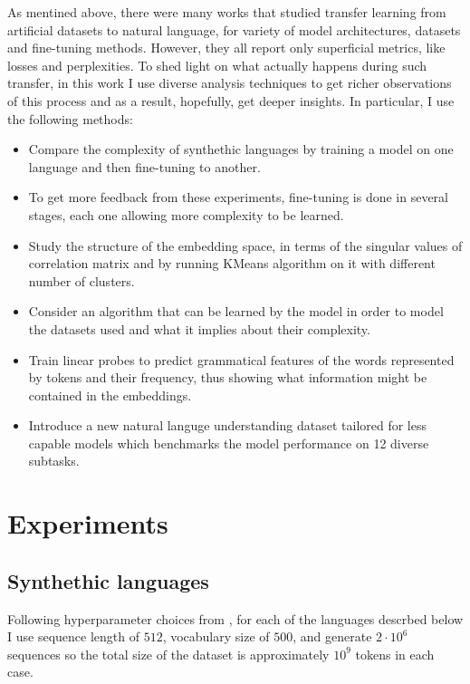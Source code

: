 \documentclass[a4paper, 11pt, oneside]{article}
\begin{document}
	As mentined above, there were many works that studied transfer learning from
	artificial datasets to natural language, for variety of model architectures,
	datasets and fine-tuning methods. However, they all report only superficial
	metrics, like losses and perplexities. To shed light on what actually happens
	during such transfer, in this work I use diverse analysis techniques to get richer
	observations of this process and as a result, hopefully, get deeper insights.
	In particular, I use the following methods:
	\begin{itemize}
		\item Compare the complexity of synthethic languages by training a model on one
			language and then fine-tuning to another.

		\item To get more feedback from these experiments, fine-tuning is done in
			several stages, each one allowing more complexity to be learned.

		\item Study the structure of the embedding space, in terms of the singular
			values of correlation matrix and by running KMeans algorithm on it with
			different number of clusters.

		\item Consider an algorithm that can be learned by the model in order to model
			the datasets used and what it implies about their complexity.

		\item Train linear probes to predict grammatical features of the words represented
			by tokens and their frequency, thus showing what information might be
			contained in the embeddings.

		\item Introduce a new natural languge understanding dataset tailored for less
			capable models which benchmarks the model performance on 12 diverse subtasks.
	\end{itemize}
	\section{Experiments}

	\subsection{Synthethic languages}
	Following hyperparameter choices from \cite{papadimitriou2023injecting}, for
	each of the languages descrbed below I use sequence length of $512$, vocabulary
	size of $500$, and generate $2 \cdot 10^{6}$ sequences so the total size of
	the dataset is approximately $10^{9}$ tokens in each case.
\end{document}
